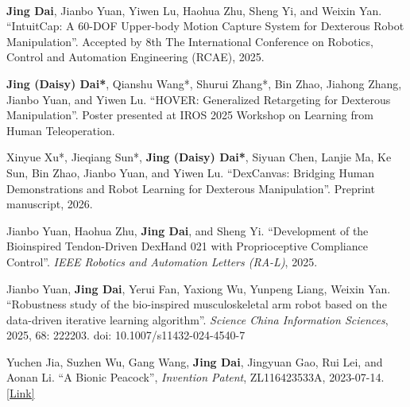 
\vspace{-17mm}

\begin{cventries}
    \cventry
    {} %
    {\ } %
    {\ } %
    {} %
    {
        \begin{cvitemize2}
            \item \textbf{Jing Dai}, Jianbo Yuan, Yiwen Lu, Haohua Zhu, Sheng Yi, and Weixin Yan. ``IntuitCap: A 60-DOF Upper-body Motion Capture System for Dexterous Robot Manipulation''. Accepted by 8th The International Conference on Robotics, Control and Automation Engineering (RCAE), 2025.
            \item \textbf{Jing (Daisy) Dai*}, Qianshu Wang*, Shurui Zhang*, Bin Zhao, Jiahong Zhang, Jianbo Yuan, and Yiwen Lu. ``HOVER: Generalized Retargeting for Dexterous Manipulation''. Poster presented at IROS 2025 Workshop on Learning from Human Teleoperation.
            \item Xinyue Xu*, Jieqiang Sun*, \textbf{Jing (Daisy) Dai*}, Siyuan Chen, Lanjie Ma, Ke Sun, Bin Zhao, Jianbo Yuan, and Yiwen Lu. ``DexCanvas: Bridging Human Demonstrations and Robot Learning for Dexterous Manipulation''. Preprint manuscript, 2026.
            \item Jianbo Yuan, Haohua Zhu, \textbf{Jing Dai}, and Sheng Yi. ``Development of the Bioinspired Tendon-Driven DexHand 021 with Proprioceptive Compliance Control''. \textit{IEEE Robotics and Automation Letters (RA-L)}, 2025.
            \item Jianbo Yuan, \textbf{Jing Dai}, Yerui Fan, Yaxiong Wu, Yunpeng Liang, Weixin Yan. ``Robustness study of the bio-inspired musculoskeletal arm robot based on the data-driven iterative learning algorithm''. \textit{Science China Information Sciences}, 2025, 68: 222203. doi: 10.1007/s11432-024-4540-7
            \item Yuchen Jia, Suzhen Wu, Gang Wang, \textbf{Jing Dai}, Jingyuan Gao, Rui Lei, and Aonan Li. ``A Bionic Peacock'', \textit{Invention Patent}, ZL116423533A, 2023-07-14. \href{https://pss-system.cponline.cnipa.gov.cn/documents/detail?prevPageTit=changgui}{\textcolor{link}{[Link]}}
            \vspace{2mm}
        \end{cvitemize2}
    }
\end{cventries}
